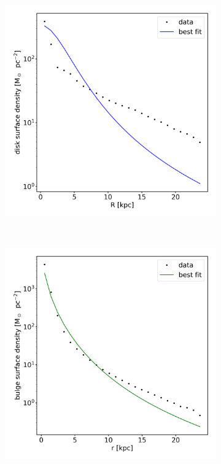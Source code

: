 \begin{figure}
    \centering
    \begin{subfigure}[b]{0.3\textwidth}
	    \includegraphics[width=\textwidth]{plots/Auriga/surface_dens_disk_fit_data.png}
	    \label{fig:disk_surfdens_fit}
    \end{subfigure}
    ~ %
    \begin{subfigure}[b]{0.3\textwidth}
    \centering
    	\includegraphics[width=\textwidth]{plots/Auriga/surface_dens_spher_fit_data.png}

\end{subfigure}
\end{figure}
